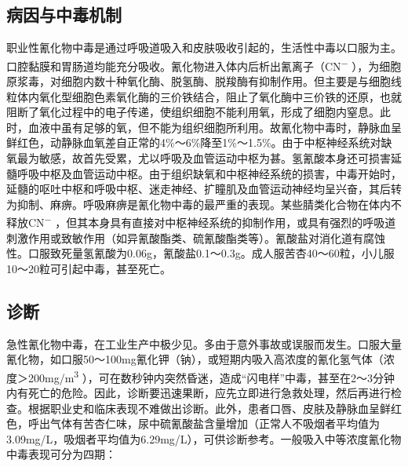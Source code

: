 \subsection{病因与中毒机制}

职业性氰化物中毒是通过呼吸道吸入和皮肤吸收引起的，生活性中毒以口服为主。口腔黏膜和胃肠道均能充分吸收。氰化物进入体内后析出氰离子（CN\textsuperscript{−}
），为细胞原浆毒，对细胞内数十种氧化酶、脱氢酶、脱羧酶有抑制作用。但主要是与细胞线粒体内氧化型细胞色素氧化酶的三价铁结合，阻止了氧化酶中三价铁的还原，也就阻断了氧化过程中的电子传递，使组织细胞不能利用氧，形成了细胞内窒息。此时，血液中虽有足够的氧，但不能为组织细胞所利用。故氰化物中毒时，静脉血呈鲜红色，动静脉血氧差自正常的4\%～6\%降至1\%～1.5\%。由于中枢神经系统对缺氧最为敏感，故首先受累，尤以呼吸及血管运动中枢为甚。氢氰酸本身还可损害延髓呼吸中枢及血管运动中枢。由于组织缺氧和中枢神经系统的损害，中毒开始时，延髓的呕吐中枢和呼吸中枢、迷走神经、扩瞳肌及血管运动神经均呈兴奋，其后转为抑制、麻痹。呼吸麻痹是氰化物中毒的最严重的表现。某些腈类化合物在体内不释放CN\textsuperscript{−}
，但其本身具有直接对中枢神经系统的抑制作用，或具有强烈的呼吸道刺激作用或致敏作用（如异氰酸酯类、硫氰酸酯类等）。氰酸盐对消化道有腐蚀性。口服致死量氢氰酸为0.06g，氰酸盐0.1～0.3g。成人服苦杏40～60粒，小儿服10～20粒可引起中毒，甚至死亡。

\subsection{诊断}

急性氰化物中毒，在工业生产中极少见。多由于意外事故或误服而发生。口服大量氰化物，如口服50～100mg氰化钾（钠），或短期内吸入高浓度的氰化氢气体（浓度＞200mg/m\textsuperscript{3}
），可在数秒钟内突然昏迷，造成“闪电样”中毒，甚至在2～3分钟内有死亡的危险。因此，诊断要迅速果断，应先立即进行急救处理，然后再进行检查。根据职业史和临床表现不难做出诊断。此外，患者口唇、皮肤及静脉血呈鲜红色，呼出气体有苦杏仁味，尿中硫氰酸盐含量增加（正常人不吸烟者平均值为3.09mg/L，吸烟者平均值为6.29mg/L），可供诊断参考。一般吸入中等浓度氰化物中毒表现可分为四期：

